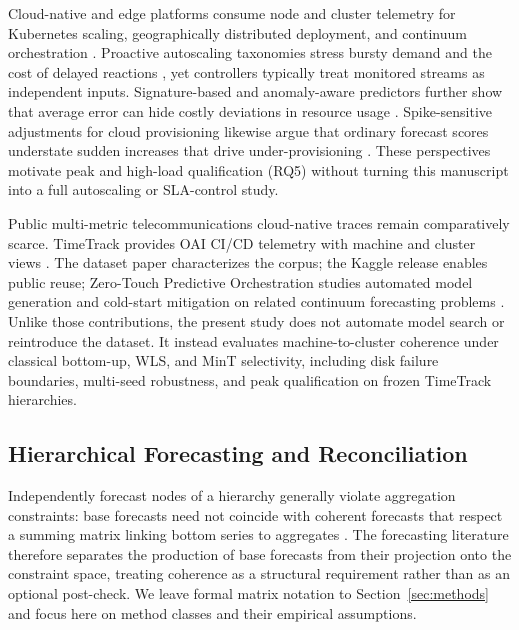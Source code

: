 \documentclass[a4paper,fleqn]{cas-dc}
\begin{document}
Cloud-native and edge platforms consume node and cluster telemetry for
Kubernetes scaling, geographically distributed deployment, and continuum
orchestration
\cite{toka2021kubernetes,rossi2020geo,casalicchio2019container}.
Proactive autoscaling taxonomies stress bursty demand and the cost of delayed
reactions
\cite{lorido2014review,qu2018auto},
yet controllers typically treat monitored streams as independent inputs.
Signature-based and anomaly-aware predictors further show that average error can
hide costly deviations in resource usage
\cite{sus2024signature}.
Spike-sensitive adjustments for cloud provisioning likewise argue that ordinary
forecast scores understate sudden increases that drive under-provisioning
\cite{agullo2025spikes}.
These perspectives motivate peak and high-load qualification ({RQ5}) without
turning this manuscript into a full autoscaling or {SLA}-control study.

Public multi-metric telecommunications cloud-native traces remain comparatively
scarce.
TimeTrack provides {OAI} {CI}/{CD} telemetry with machine and cluster views
\cite{meliani2025timetrack,meliani2025timetrackkaggle}.
The dataset paper characterizes the corpus; the Kaggle release enables public
reuse; Zero-Touch Predictive Orchestration studies automated model generation
and cold-start mitigation on related continuum forecasting problems
\cite{meliani2026zerotouch}.
Unlike those contributions, the present study does not automate model search or
reintroduce the dataset.
It instead evaluates machine-to-cluster coherence under classical bottom-up,
{WLS}, and MinT selectivity, including disk failure boundaries, multi-seed
robustness, and peak qualification on frozen TimeTrack hierarchies.

\subsection{Hierarchical Forecasting and Reconciliation}
Independently forecast nodes of a hierarchy generally violate aggregation
constraints: base forecasts need not coincide with coherent forecasts that
respect a summing matrix linking bottom series to aggregates
\cite{hyndman2011optimal,hyndman2021forecasting}.
The forecasting literature therefore separates the production of base forecasts
from their projection onto the constraint space, treating coherence as a
structural requirement rather than as an optional post-check.
We leave formal matrix notation to Section~\ref{sec:methods} and focus here on
method classes and their empirical assumptions.
\end{document}
